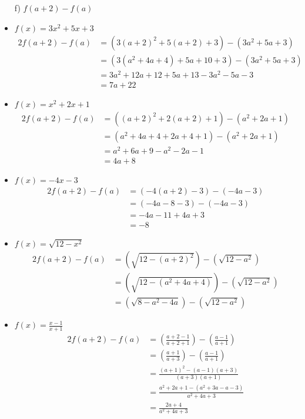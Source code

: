 \documentclass{templateNote}
\begin{document}
\begin{itemize}
    \item[f)] $f(a + 2) - f(a)$
    \item $f(x) = 3x^2 + 5x + 3$
    \begin{alignat*}{2}
        f(a + 2) - f(a) &= (3(a + 2)^2 + 5(a + 2) + 3) - (3a^2 + 5a + 3) \\
        &= (3(a^2 + 4a + 4) + 5a + 10 + 3) - (3a^2 + 5a + 3) \\
        &= 3a^2 + 12a + 12 + 5a + 13 - 3a^2 - 5a - 3 \\
        &= 7a + 22
    \end{alignat*}
    \item $f(x) = x^2 + 2x + 1$
    \begin{alignat*}{2}
        f(a + 2) - f(a) &= ((a + 2)^2 + 2(a + 2) + 1) - (a^2 + 2a + 1) \\
        &= (a^2 + 4a + 4 + 2a + 4 + 1) - (a^2 + 2a + 1) \\
        &= a^2 + 6a + 9 - a^2 - 2a - 1 \\
        &= 4a + 8
    \end{alignat*}
    \item $f(x) = -4x - 3$
    \begin{alignat*}{2}
        f(a + 2) - f(a) &= (-4(a + 2) - 3) - (-4a - 3) \\
        &= (-4a - 8 - 3) - (-4a - 3) \\
        &= -4a - 11 + 4a + 3 \\
        &= -8
    \end{alignat*}
    \item $f(x) = \sqrt{12 - x^2}$
    \begin{alignat*}{2}
        f(a + 2) - f(a) &= (\sqrt{12 - (a + 2)^2}) - (\sqrt{12 - a^2}) \\
        &= (\sqrt{12 - (a^2 + 4a + 4)}) - (\sqrt{12 - a^2}) \\
        &= (\sqrt{8 - a^2 - 4a}) - (\sqrt{12 - a^2})
    \end{alignat*}
    \item $f(x) = \frac{x-1}{x+1}$
    \begin{alignat*}{2}
        f(a + 2) - f(a) &= (\frac{a + 2 - 1}{a + 2 + 1}) - (\frac{a - 1}{a + 1}) \\
        &= (\frac{a + 1}{a + 3}) - (\frac{a - 1}{a + 1}) \\
        &= \frac{(a + 1)^2 - (a - 1)(a + 3)}{(a + 3)(a + 1)} \\
        &= \frac{a^2 + 2a + 1 - (a^2 + 3a - a - 3)}{a^2 + 4a + 3} \\
        &= \frac{2a + 4}{a^2 + 4a + 3}
    \end{alignat*}
\end{itemize}
\end{document}
